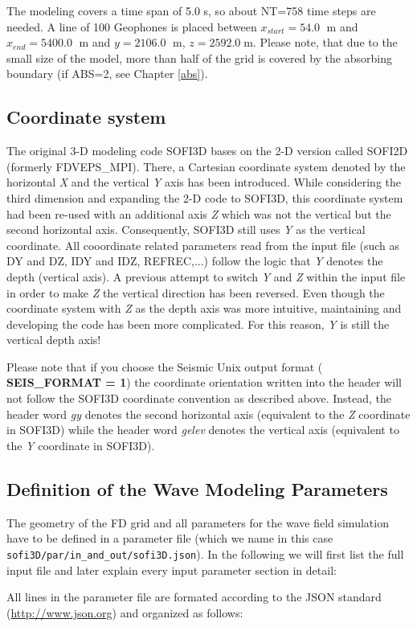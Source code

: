 \documentclass[11pt,onecolumn,oneside]{article}
\begin{document}
The modeling covers a time span of 5.0 s, so about NT=758 time steps are needed. A line of 100 Geophones is placed between $x_{start}=54.0\;$ m and $x_{end}=5400.0\;$ m and $y=2106.0\;$ m, $z=2592.0\;$m. Please note, that due to the small size of the model, more than half of the grid is covered by the absorbing boundary (if ABS=2, see Chapter \ref{abs}). 

\subsection{Coordinate system}
\label{coord_system}
The original 3-D modeling code SOFI3D bases on the 2-D version called SOFI2D (formerly FDVEPS\_MPI). There, a Cartesian coordinate system denoted by the horizontal \textit{X} and the vertical \textit{Y} axis has been introduced. While considering the third dimension and expanding the 2-D code to SOFI3D, this coordinate system had been re-used with an additional axis \textit{Z} which was not the vertical but the second horizontal axis. Consequently, SOFI3D still uses \textit{Y} as the vertical coordinate. All cooordinate related parameters read from the input file (such as DY and DZ, IDY and IDZ, REFREC,...) follow the logic that \textit{Y} denotes the depth (vertical axis). A previous attempt to switch \textit{Y} and \textit{Z} within the input file in order to make \textit{Z} the vertical direction has been reversed. Even though the coordinate system with \textit{Z} as the depth axis was more intuitive, maintaining and developing the code has been more complicated. For this reason, \textit{Y} is still the vertical depth axis!

Please note that if you choose the Seismic Unix output format ( \textbf{SEIS\_FORMAT = 1}) the coordinate orientation written into the header will not follow the SOFI3D coordinate convention as described above. Instead, the header word \textit{gy} denotes the second horizontal axis (equivalent to the \textit{Z} coordinate in SOFI3D) while the header word \textit{gelev} denotes the vertical axis (equivalent to the \textit{Y} coordinate in SOFI3D).

\subsection{Definition of the Wave Modeling Parameters}
\label{modelgeom}
The geometry of the FD grid and all parameters for the wave field simulation have to be defined in a parameter file (which we name in this case { \lstinline{sofi3D/par/in_and_out/sofi3D.json}}). In the following we will first list the full input file and later explain every input parameter section in detail:

All lines in the parameter file are formated according to the JSON standard (\url{http://www.json.org}) and organized as follows: 
\end{document}
